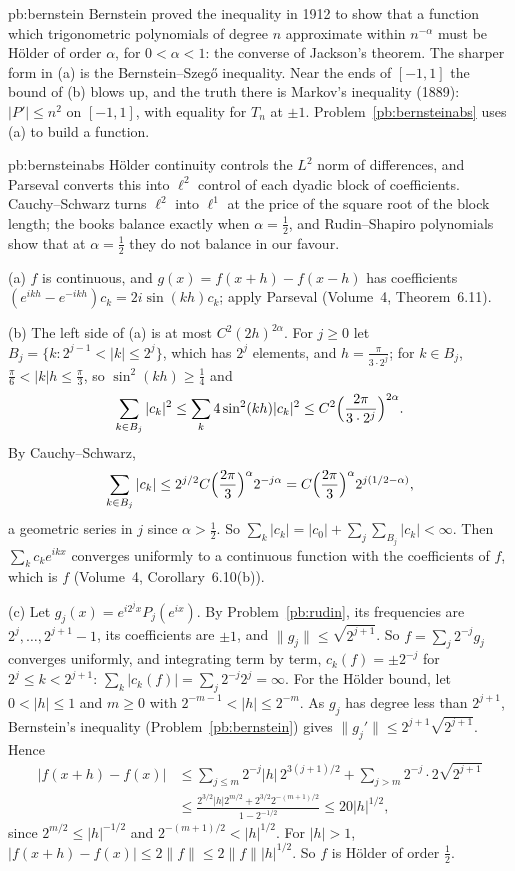 \begin{solution}{pb:bernstein}
\leads Bernstein proved the inequality in 1912 to show that a function which trigonometric polynomials
of degree $n$ approximate within $n^{-\alpha}$ must be Hölder of order $\alpha$, for $0<\alpha<1$: the converse of Jackson's theorem. The sharper form
in (a) is the Bernstein--Szegő inequality. Near the ends of $[-1,1]$ the bound of (b) blows up, and the truth there is Markov's
inequality (1889): $|P'|\le n^2$ on $[-1,1]$, with equality for $T_n$ at $\pm1$. Problem~\ref{pb:bernsteinabs} uses (a) to build a function.
\end{solution}

\begin{solution}{pb:bernsteinabs}
\idea Hölder continuity controls the $L^2$ norm of differences, and Parseval converts this into $\ell^2$ control of each dyadic block of
coefficients. Cauchy--Schwarz turns $\ell^2$ into $\ell^1$ at the price of the square root of the block length; the books balance exactly
when $\alpha=\frac12$, and Rudin--Shapiro polynomials show that at $\alpha=\frac12$ they do not balance in our favour.

\writeup (a) $f$ is continuous, and $g(x)=f(x+h)-f(x-h)$ has coefficients $(e^{ikh}-e^{-ikh})c_k=2i\sin(kh)c_k$; apply Parseval (Volume~4, Theorem~6.11).

(b) The left side of (a) is at most $C^2(2h)^{2\alpha}$. For $j\ge0$ let $B_j=\{k:2^{j-1}<|k|\le2^j\}$, which has $2^j$ elements, and $h=\frac\pi{3\cdot2^j}$; for
$k\in B_j$, $\frac\pi6<|k|h\le\frac\pi3$, so $\sin^2(kh)\ge\frac14$ and
\[
\sum_{k\in B_j}|c_k|^2\le\sum_k4\sin^2(kh)|c_k|^2\le C^2\Bigl(\frac{2\pi}{3\cdot2^j}\Bigr)^{2\alpha}.
\]
By Cauchy--Schwarz,
\[
\sum_{k\in B_j}|c_k|\le2^{j/2}C\Bigl(\frac{2\pi}3\Bigr)^\alpha2^{-j\alpha}=C\Bigl(\frac{2\pi}3\Bigr)^\alpha2^{j(1/2-\alpha)},
\]
a geometric series in $j$ since $\alpha>\frac12$. So
$\sum_k|c_k|=|c_0|+\sum_j\sum_{B_j}|c_k|<\infty$. Then $\sum_kc_ke^{ikx}$ converges uniformly to a continuous function with the coefficients of $f$, which is $f$
(Volume~4, Corollary~6.10(b)).

(c) Let $g_j(x)=e^{i2^jx}P_j(e^{ix})$. By Problem~\ref{pb:rudin}, its frequencies are $2^j,\dots,2^{j+1}-1$, its coefficients are $\pm1$, and $\|g_j\|\le\sqrt{2^{j+1}}$. So
$f=\sum_j2^{-j}g_j$ converges uniformly, and integrating term by term, $c_k(f)=\pm2^{-j}$ for $2^j\le k<2^{j+1}$: $\sum_k|c_k(f)|=\sum_j2^{-j}2^j=\infty$. For the Hölder
bound, let $0<|h|\le1$ and $m\ge0$ with $2^{-m-1}<|h|\le2^{-m}$. As $g_j$ has degree less than $2^{j+1}$, Bernstein's inequality (Problem~\ref{pb:bernstein})
gives $\|g_j'\|\le2^{j+1}\sqrt{2^{j+1}}$. Hence
\[
\begin{aligned}|f(x+h)-f(x)|&\le\sum_{j\le m}2^{-j}|h|\,2^{3(j+1)/2}+\sum_{j>m}2^{-j}\cdot2\sqrt{2^{j+1}}\\&\le\frac{2^{3/2}|h|2^{m/2}+2^{3/2}2^{-(m+1)/2}}{1-2^{-1/2}}\le20|h|^{1/2},\end{aligned}
\]
since $2^{m/2}\le|h|^{-1/2}$ and $2^{-(m+1)/2}<|h|^{1/2}$. For $|h|>1$, $|f(x+h)-f(x)|\le2\|f\|\le2\|f\||h|^{1/2}$. So $f$ is Hölder of order $\frac12$.


\end{solution}
